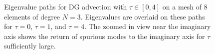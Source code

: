 \documentclass[10pt]{article}
\begin{document}
\begin{figure}
\centering
{}
\hspace{1em}
\caption{Eigenvalue paths for DG advection with $\tau \in [0,4]$ on a mesh of 8 elements of degree $N=3$.  Eigenvalues are overlaid on these paths for $\tau = 0$, $\tau = 1$, and $\tau = 4$.  The zoomed in view near the imaginary axis shows the return of spurious modes to the imaginary axis for $\tau$ sufficiently large. }
\label{fig:track1D}
\end{figure}
\end{document}
